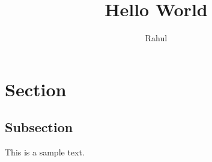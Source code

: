 \documentclass[12pt]{article}
\title{Hello World}
\author{Rahul}
\begin{document}
\maketitle

\section{Section}
\subsection{Subsection}

This is a sample text.
\end{document}
